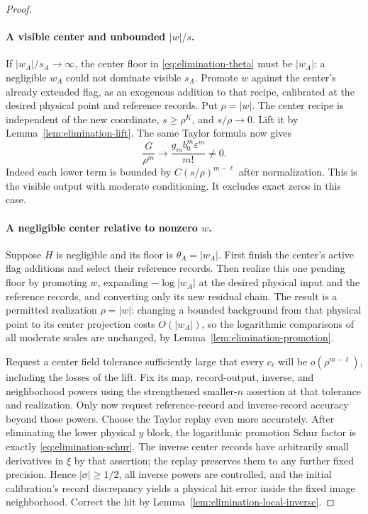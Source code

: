 \begin{proof}
\paragraph{A visible center and unbounded $|w|/s$.}
If $|w_A|/s_A\to\infty$, the center floor in
\eqref{eq:elimination-theta} must be $|w_A|$: a negligible $w_A$
could not dominate visible $s_A$.  Promote $w$ against the center's
already extended flag, as an exogenous addition to that recipe,
calibrated at the desired physical point and reference records.  Put
$\rho=|w|$.  The center recipe is independent of the new coordinate,
$s\ge\rho^K$, and $s/\rho\to0$.  Lift it by
Lemma~\ref{lem:elimination-lift}.  The same Taylor formula now gives
\begin{equation}\label{eq:elimination-large-w}
 \frac{G}{\rho^m}\longrightarrow
 \frac{g_m b_0^m\varepsilon^m}{m!}\ne0.
\end{equation}
Indeed each lower term is bounded by
$C(s/\rho)^{m-\ell}$ after normalization.  This is the visible
output with moderate conditioning.  It excludes exact zeros in this
case.

\paragraph{A negligible center relative to nonzero $w$.}
Suppose $H$ is negligible and its floor is $\theta_A=|w_A|$.
First finish the center's active flag additions and select their
reference records.  Then realize this one pending floor by promoting
$w$, expanding $-\log|w_A|$ at the desired physical input and the
reference records, and converting only its new residual chain.
The result is a permitted realization $\rho=|w|$: changing a bounded
background from that physical point to its center projection costs
$O(|w_A|)$, so the logarithmic comparisons of all moderate scales are
unchanged, by Lemma~\ref{lem:elimination-promotion}.

Request a center field tolerance sufficiently large that every
$c_\ell$ will be $o(\rho^{m-\ell})$, including the losses of the
lift.  Fix its map, record-output, inverse, and neighborhood powers
using the strengthened smaller-$n$ assertion at that tolerance and
realization.  Only now request reference-record and inverse-record
accuracy beyond those powers.  Choose the Taylor replay even more
accurately.  After eliminating the lower physical $y$ block, the
logarithmic promotion Schur factor is exactly
\eqref{eq:elimination-schur}.  The inverse center records
have arbitrarily small derivatives in $\xi$ by that assertion;
the replay preserves them to any further fixed precision.  Hence
$|\sigma|\ge1/2$, all inverse powers are controlled, and the
initial calibration's record discrepancy yields a physical hit error
inside the fixed image neighborhood.  Correct the hit by
Lemma~\ref{lem:elimination-local-inverse}.


\end{proof}
